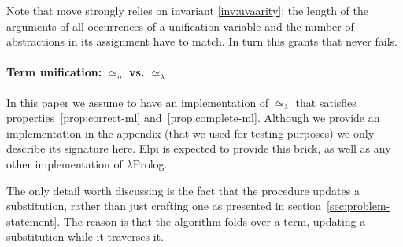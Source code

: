 \documentclass[sigconf,natbib=false,review]{acmart}
\newcommand{\UnifRel}{\ensuremath{\simeq}}
\newcommand{\Uo}{\ensuremath{\UnifRel_o}\xspace}
\newcommand{\Ue}{\ensuremath{\UnifRel_\lambda}\xspace}
\begin{document}
\noindent
Note that move strongly relies on invariant \ref{inv:uvaarity}: the length
of the arguments of all occurrences of a unification variable and the
number of abstractions in its assignment have to match. In turn
this grants that  never fails.



\paragraph{Term unification: \Uo vs. \Ue}

In this paper we assume to have an implementation of \Ue that satisfies
properties~\ref{prop:correct-ml} and~\ref{prop:complete-ml}. Although we provide an
implementation in the appendix (that we used for testing purposes) we only
describe its signature here. Elpi is expected to provide this brick, as well as
any other implementation of $\lambda$Prolog.



\noindent
The only detail worth discussing is the fact that the procedure updates a
substitution, rather than just crafting one as presented in
section~\ref{sec:problem-statement}. The reason is that the algorithm folds
over a term, updating a substitution while it traverses it.



\end{document}
